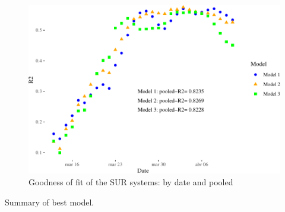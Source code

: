 \documentclass[]{elsarticle} %
\makeatletter
\def\maxwidth{\ifdim\Gin@nat@width>\linewidth\linewidth
\else\Gin@nat@width\fi}
\let\Oldincludegraphics\includegraphics
\renewcommand{\includegraphics}[1]{\Oldincludegraphics[width=\maxwidth]{#1}}
\makeatother
\begin{document}
\begin{figure}
\centering
\includegraphics{Environmental-Correlates-of-COVID19-Spain_files/figure-latex/goodness-of-fit-1.pdf}
\caption{\label{fig:goodness-of-fit} Goodness of fit of the SUR systems:
by date and pooled}
\end{figure}

Summary of best model.
\end{document}
